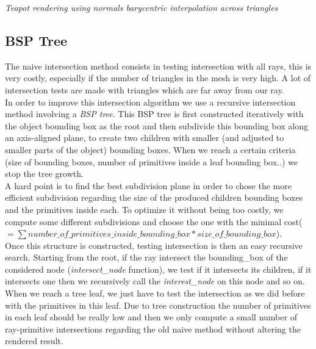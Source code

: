 \documentclass[a4,12pt]{article}
\begin{document}
\begin{center}
\begin{minipage}[b]{0.40\linewidth}
\begin{center}
				\textit{Teapot rendering using normals barycentric interpolation across triangles}
			\end{center}
		\end{minipage}
	\end{center}
	
	\subsection{BSP Tree}
	The naive intersection method consists in testing intersection with all rays, this is very costly, especially if the number of triangles in the mesh is very high. A lot of intersection tests are made with triangles which are far away from our ray.\\
	
	In order to improve this intersection algorithm we use a recursive intersection method involving a \textit{BSP tree}. This BSP tree is first constructed iteratively with the object bounding box as the root and then subdivide this bounding box along an axis-aligned plane, to create two children with smaller (and adjusted to smaller parts of the object) bounding boxes. When we reach a certain criteria (size of bounding boxes, number of primitives inside a leaf bounding box..) we stop the tree growth.\\
	
	A hard point is to find the best subdivision plane in order to chose the more efficient subdivision regarding the size of the produced children bounding boxes and the primitives inside each. To optimize it without being too costly, we compute some different subdivisions and choose the one with the minimal cost($= \sum number\_of\_primitives\_inside\_bounding\_box*size\_of\_bounding\_box$).\\
	
	Once this structure is constructed, testing intersection is then an easy recursive search. Starting from the root, if the ray intersect the bounding\_box of the considered node (\textit{intersect\_node} function), we test if it intersects its children, if it intersects one then we recursively call the \textit{interest\_node} on this node and so on. When we reach a tree leaf, we just have to test the intersection as we did before with the primitives in this leaf. Due to tree construction the number of primitives in each leaf should be really low and then we only compute a small number of ray-primitive intersections regarding the old naive method without altering the rendered result.\\
	
\end{document}
